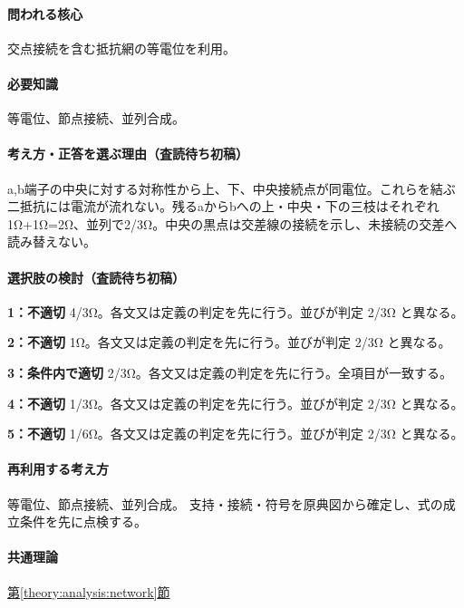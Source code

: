 \paragraph{問われる核心} 交点接続を含む抵抗網の等電位を利用。

\paragraph{必要知識} 等電位、節点接続、並列合成。

\paragraph{考え方・正答を選ぶ理由（査読待ち初稿）} a,b端子の中央に対する対称性から上、下、中央接続点が同電位。これらを結ぶ二抵抗には電流が流れない。残るaからbへの上・中央・下の三枝はそれぞれ1Ω+1Ω=2Ω、並列で2/3Ω。中央の黒点は交差線の接続を示し、未接続の交差へ読み替えない。

\paragraph{選択肢の検討（査読待ち初稿）}\mbox{}\par

\noindent\textbf{1：不適切} 4/3Ω。各文又は定義の判定を先に行う。並びが判定 2/3Ω と異なる。\par

\noindent\textbf{2：不適切} 1Ω。各文又は定義の判定を先に行う。並びが判定 2/3Ω と異なる。\par

\noindent\textbf{3：条件内で適切} 2/3Ω。各文又は定義の判定を先に行う。全項目が一致する。\par

\noindent\textbf{4：不適切} 1/3Ω。各文又は定義の判定を先に行う。並びが判定 2/3Ω と異なる。\par

\noindent\textbf{5：不適切} 1/6Ω。各文又は定義の判定を先に行う。並びが判定 2/3Ω と異なる。\par

\paragraph{再利用する考え方} 等電位、節点接続、並列合成。 支持・接続・符号を原典図から確定し、式の成立条件を先に点検する。

\paragraph{共通理論} \hyperref[theory:analysis:network]{第\ref*{theory:analysis:network}節}

